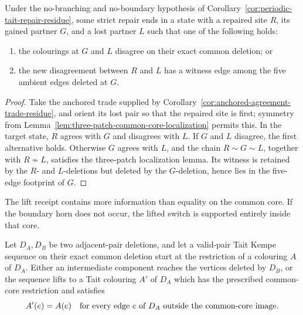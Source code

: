 \begin{corollary}
\label{cor:localized-anchored-agreement-trade}
Under the no-branching and no-boundary hypothesis of
Corollary~\ref{cor:periodic-tait-repair-residue}, some strict repair ends in
a state with a repaired site $R$, its gained partner $G$, and a lost
partner $L$ such that one of the following holds:
\begin{enumerate}
\item the colourings at $G$ and $L$ disagree on their exact common
      deletion; or
\item the new disagreement between $R$ and $L$ has a witness edge among
      the five ambient edges deleted at $G$.
\end{enumerate}
\end{corollary}

\begin{proof}
Take the anchored trade supplied by
Corollary~\ref{cor:anchored-agreement-trade-residue}, and orient its lost
pair so that the repaired site is first; symmetry from
Lemma~\ref{lem:three-patch-common-core-localization} permits this.  In the
target state, $R$ agrees with $G$ and disagrees with $L$.  If $G$
and $L$ disagree, the first alternative holds.  Otherwise $G$ agrees
with $L$, and the chain $R\sim G\sim L$, together with
$R\not\sim L$, satisfies the three-patch localization lemma.  Its witness
is retained by the $R$- and $L$-deletions but deleted by the
$G$-deletion, hence lies in the five-edge footprint of $G$.
\end{proof}

The lift receipt contains more information than equality on the common core.
If the boundary horn does not occur, the lifted switch is supported entirely
inside that core.

\begin{lemma}
\label{lem:common-core-lift-support-confinement}
Let $D_A,D_B$ be two adjacent-pair deletions, and let a valid-pair Tait
Kempe sequence on their exact common deletion start at the restriction of a
colouring $A$ of $D_A$.  Either an intermediate component reaches the
vertices deleted by $D_B$, or the sequence lifts to a Tait colouring $A'$ of
$D_A$ which has the prescribed common-core restriction and satisfies
\[
 A'(e)=A(e)
 \quad\hbox{for every edge $e$ of $D_A$ outside the common-core image.}
\]
\end{lemma}

